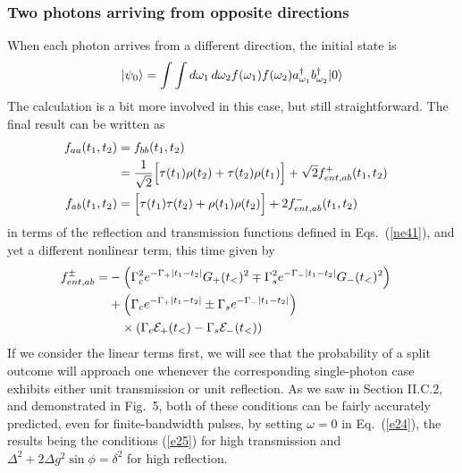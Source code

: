 \documentclass[aps,pra,twocolumn,floatfix,superscriptaddress]{revtex4}
\begin{document}
\subsubsection{Two photons arriving from opposite directions}
When each photon arrives from a different direction, the initial state is 
\begin{equation}
|\psi_0\rangle = \int \int d\omega_1\,d\omega_2 f(\omega_1)f(\omega_2) a^\dagger_{\omega_1} b^\dagger_{\omega_2} |0\rangle \end{equation}
The calculation is a bit more involved in this case, but still straightforward.  The final result can be written as
\begin{align}
f_{aa}(t_1,t_2) &= f_{bb}(t_1,t_2) \cr
&=\frac{1}{\sqrt 2} \Bigl[\tau(t_1)\rho(t_2)+\tau(t_2)\rho(t_1)\Bigr]+\sqrt 2 f_{ent,ab}^+(t_1,t_2) \cr
f_{ab}(t_1,t_2) &= \Bigl[\tau(t_1)\tau(t_2)+\rho(t_1)\rho(t_2) \Bigr]+2 f_{ent,ab}^-(t_1,t_2)\cr
\label{eq45}
\end{align}
in terms of the reflection and transmission functions defined in Eqs.~(\ref{ne41}), and yet a different nonlinear term, this time given by
\begin{align}
f_{ent,ab}^\pm = &-\left(\Gamma_c^2 e^{-\Gamma_+|t_1-t_2|} G_+(t_<)^2\mp \Gamma_s^2 e^{-\Gamma_-|t_1-t_2|} G_-(t_<)^2\right) \cr
&+\left(\Gamma_c e^{-\Gamma_+|t_1-t_2|}\pm \Gamma_s e^{-\Gamma_-|t_1-t_2|}\right) \cr
&\quad\times\left(\Gamma_c \mathcal{E}_+(t_<)- \Gamma_s \mathcal{E}_-(t_<)\right)
\label{ne46}
\end{align}
If we consider the linear terms first, we will see that the probability of a split outcome will approach one whenever the corresponding single-photon case exhibits either unit transmission or unit reflection.  As we saw in Section II.C.2, and demonstrated in Fig.~5, both of these conditions can be fairly accurately predicted, even for finite-bandwidth pulses, by setting $\omega=0$ in Eq.~(\ref{e24}), the results being the conditions (\ref{e25}) for high transmission and $\Delta^2 + 2\Delta g^2\sin\phi=\delta^2$ for high reflection.
\end{document}
